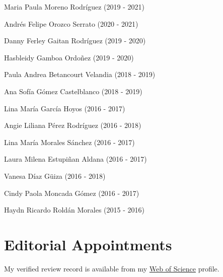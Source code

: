 \documentclass[11pt,a4paper,]{awesome-cv}
\begin{document}
\begin{cventries}
{\begin{cvitems}
\item Maria Paula Moreno Rodríguez (2019 - 2021)
\item Andrés Felipe Orozco Serrato (2020 - 2021)
\item Danny Ferley Gaitan Rodríguez (2019 - 2020)
\item Hasbleidy Gamboa Ordoñez (2019 - 2020)
\item Paula Andrea Betancourt Velandia  (2018 - 2019)
\item Ana Sofía Gómez Castelblanco (2018 - 2019)
\item Lina María García Hoyos  (2016 - 2017)
\item Angie Liliana Pérez Rodríguez  (2016 - 2018)
\item Lina María Morales Sánchez (2016 - 2017)
\item Laura Milena Estupiñan Aldana  (2016 - 2017)
\item Vanesa Díaz Güiza  (2016 - 2018)
\item Cindy Paola Moncada Gómez (2016 - 2017)
\item Haydn Ricardo Roldán Morales (2015 - 2016)
\end{cvitems}}
\end{cventries}

\hypertarget{editorial-appointments}{%
\section{Editorial Appointments}\label{editorial-appointments}}

My verified review record is available from my
\href{https://www.webofscience.com/wos/author/record/387716}{Web of
Science} profile.
\end{document}
